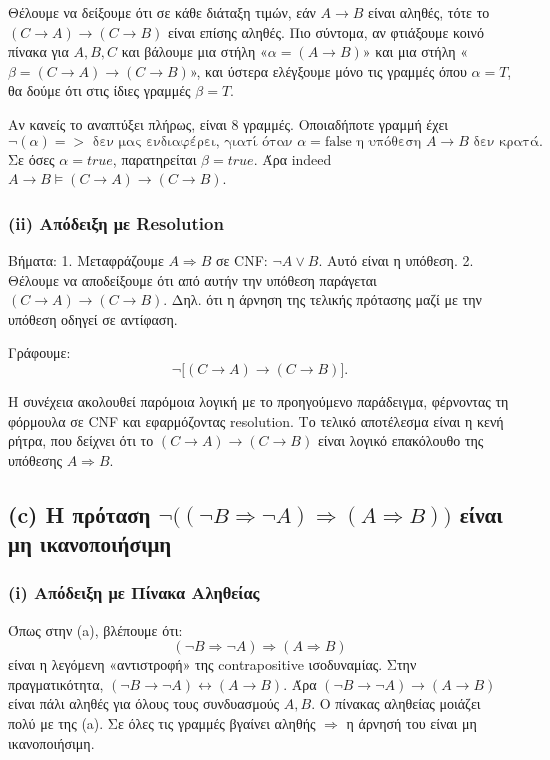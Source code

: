 \documentclass[a4paper,12pt]{article}
\begin{document}
Θέλουμε να δείξουμε ότι σε κάθε διάταξη τιμών, εάν \(A \to B\) είναι αληθές, τότε το \((C \to A) \to (C \to B)\) είναι επίσης αληθές. Πιο σύντομα, αν φτιάξουμε κοινό πίνακα για \(A, B, C\) και βάλουμε μια στήλη «\(\alpha = (A \to B)\)» και μια στήλη «\(\beta = (C \to A) \to (C \to B)\)», και ύστερα ελέγξουμε μόνο τις γραμμές όπου \(\alpha = T\), θα δούμε ότι στις ίδιες γραμμές \(\beta = T\).

Αν κανείς το αναπτύξει πλήρως, είναι 8 γραμμές. Οποιαδήποτε γραμμή έχει \(\neg(\alpha) => \text{ δεν μας ενδιαφέρει, γιατί όταν } \alpha = \text{false η υπόθεση } A \to B \text{ δεν κρατά.}\) Σε όσες \(\alpha = true\), παρατηρείται \(\beta = true\). Άρα indeed \(A \to B \models (C \to A) \to (C \to B)\).

\subsubsection*{(ii) Απόδειξη με Resolution}

Βήματα:
1. Μεταφράζουμε \(A \Rightarrow B\) σε CNF: \(\neg A \lor B\). Αυτό είναι η υπόθεση.
2. Θέλουμε να αποδείξουμε ότι από αυτήν την υπόθεση παράγεται \((C \to A) \to (C \to B)\). Δηλ. ότι η άρνηση της τελικής πρότασης μαζί με την υπόθεση οδηγεί σε αντίφαση.

Γράφουμε:
\[
\neg \bigl[(C \to A) \to (C \to B)\bigr].
\]

Η συνέχεια ακολουθεί παρόμοια λογική με το προηγούμενο παράδειγμα, φέρνοντας τη φόρμουλα σε CNF και εφαρμόζοντας resolution. Το τελικό αποτέλεσμα είναι η κενή ρήτρα, που δείχνει ότι το \((C \to A) \to (C \to B)\) είναι λογικό επακόλουθο της υπόθεσης \(A \Rightarrow B\).

\subsection*{(c) Η πρόταση \(\neg \bigl((\neg B \Rightarrow \neg A) \Rightarrow (A \Rightarrow B)\bigr)\) είναι μη ικανοποιήσιμη}

\subsubsection*{(i) Απόδειξη με Πίνακα Αληθείας}

Όπως στην (a), βλέπουμε ότι:
\[
(\neg B \Rightarrow \neg A) \Rightarrow (A \Rightarrow B)
\]
είναι η λεγόμενη «αντιστροφή» της contrapositive ισοδυναμίας. Στην πραγματικότητα, \((\neg B \to \neg A) \leftrightarrow (A \to B)\). Άρα \((\neg B \to \neg A) \to (A \to B)\) είναι πάλι αληθές για όλους τους συνδυασμούς \(A, B\). Ο πίνακας αληθείας μοιάζει πολύ με της (a). Σε όλες τις γραμμές βγαίνει αληθής \(\Rightarrow\) η άρνησή του είναι μη ικανοποιήσιμη.
\end{document}
